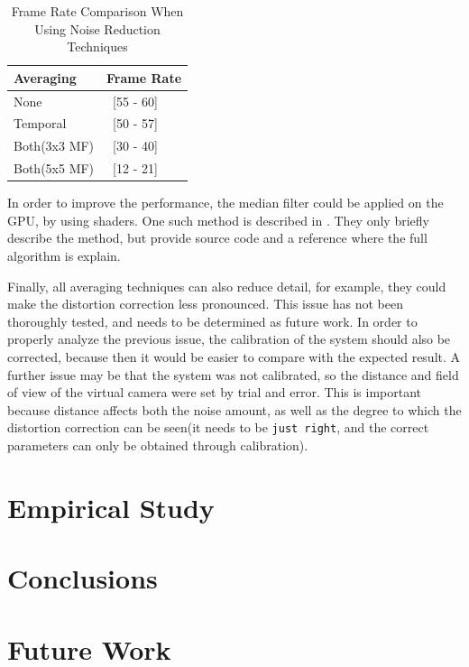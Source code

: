 \documentclass[]{article}
\begin{document}
\begin{table}
\begin{center}
    \begin{tabular}{ | l | l |}
    \hline
    Averaging & Frame Rate \\ \hline
    None & ~[55 - 60] \\ \hline
    Temporal & ~[50 - 57] \\ \hline
    Both(3x3 MF) & ~[30 - 40] \\ \hline
    Both(5x5 MF) & ~[12 - 21] \\
    \hline
    \end{tabular}    
    
\end{center}
\caption{Frame Rate Comparison When Using Noise Reduction Techniques}
\label{tabel:FrameRateReductionDueToAveraging}
\end{table}

In order to improve the performance, the median filter could be applied on the GPU, by using shaders. One such method  is described in \cite{park}. They only briefly describe the method, but provide source code and a reference where the full algorithm is explain.

Finally, all averaging techniques can also reduce detail, for example, they could make the distortion correction less pronounced. This issue has not been thoroughly tested, and needs to be determined as future work. In order to properly analyze the previous issue, the calibration of the system should also be corrected, because then it would be easier to compare with the expected result. A further issue may be that the system was not calibrated, so the distance and field of view of the virtual camera were set by trial and error. This is important because distance affects both the noise amount, as well as the degree to which the distortion correction can be seen(it needs to be \verb|just right|, and the correct parameters can only be obtained through calibration).

\section{Empirical Study}
\section{Conclusions}
\section{Future Work}

\newpage


\end{document}
